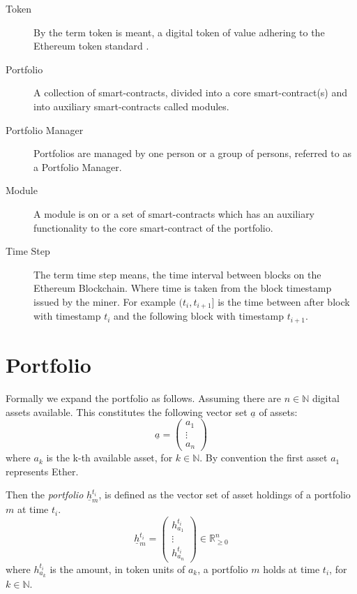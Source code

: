 \documentclass[9pt,oneside]{amsart}
\theoremstyle{plain}
\begin{document}
    \begin{description}
    \item[Token] By the term token is meant, a digital token of value adhering to the Ethereum token standard \cite{tokenstandard}.
    \item[Portfolio] A collection of smart-contracts, divided into a core smart-contract(s) and into auxiliary smart-contracts called modules.
    \item[Portfolio Manager] Portfolios are managed by one person or a group of persons, referred to as a Portfolio Manager.
    \item[Module] A module is on or a set of smart-contracts which has an auxiliary functionality to the core smart-contract of the portfolio.
    \item[Time Step] The term time step means, the time interval between blocks on the Ethereum Blockchain. Where time is taken from the block timestamp issued by the miner. For example $(t_i, t_{i+1}]$ is the time between after block with timestamp $t_i$ and the following block with timestamp $t_{i+1}$.
        
    \end{description}
    
    \section{Portfolio}\label{app:defportfolio}
    
    Formally we expand the portfolio as follows. Assuming there are $n \in \mathbb{N}$ digital assets available. This constitutes the following vector set $\underline{a}$ of assets:
    \begin{equation}
        \underline{a} = \begin{pmatrix}a_{1}\\ \vdots \\ a_{n}\end{pmatrix}
    \end{equation}
    where $a_k$ is the k-th available asset, for $k \in \mathbb{N}$.
    By convention the first asset $a_1$ represents Ether.
    
    Then the \textit{portfolio} $\underline{h}_m^{t_i}$, is defined as the vector set of asset holdings of a portfolio $m$ at time $t_i$.
    \begin{equation}
        \underline{h}_m^{t_i} = \begin{pmatrix}h_{a_{1}}^{t_i}\\ \vdots \\ h_{a_{n}}^{t_i}\end{pmatrix} \in \mathbb{R}_{\geq 0}^n
    \end{equation}
    where $h_{a_{k}}^{t_i}$ is the amount, in token units of $a_k$, a portfolio $m$ holds at time $t_i$, for $k \in \mathbb{N}$.
    
\end{document}
